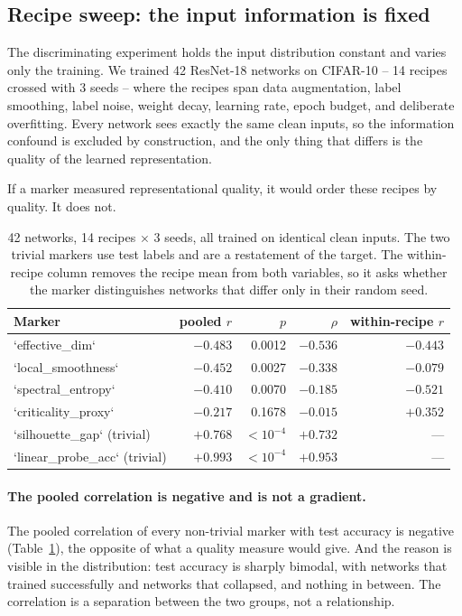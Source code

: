 \documentclass[10pt]{article}
\begin{document}
\subsection{Recipe sweep: the input information is fixed}

The discriminating experiment holds the input distribution constant and varies
only the training. We trained 42 ResNet-18 networks on CIFAR-10 -- 14 recipes
crossed with 3 seeds -- where the recipes span data augmentation, label
smoothing, label noise, weight decay, learning rate, epoch budget, and
deliberate overfitting. Every network sees exactly the same clean inputs, so
the information confound is excluded by construction, and the only thing that
differs is the quality of the learned representation.

If a marker measured representational quality, it would order these recipes by
quality. It does not.

\begin{table}[t]
\centering
\small
\begin{tabular}{@{}lrrrr@{}}
\hline
Marker & pooled $r$ & $p$ & $\rho$ & within-recipe $r$ \\
\hline
`effective\_dim` & $-0.483$ & 0.0012 & $-0.536$ & $-0.443$ \\
`local\_smoothness` & $-0.452$ & 0.0027 & $-0.338$ & $-0.079$ \\
`spectral\_entropy` & $-0.410$ & 0.0070 & $-0.185$ & $-0.521$ \\
`criticality\_proxy` & $-0.217$ & 0.1678 & $-0.015$ & $+0.352$ \\
\hline
`silhouette\_gap` (trivial) & $+0.768$ & $<10^{-4}$ & $+0.732$ & --- \\
`linear\_probe\_acc` (trivial) & $+0.993$ & $<10^{-4}$ & $+0.953$ & --- \\
\hline
\end{tabular}
\caption{42 networks, 14 recipes $\times$ 3 seeds, all trained on identical
clean inputs. The two trivial markers use test labels and are a restatement of
the target. The within-recipe column removes the recipe mean from both
variables, so it asks whether the marker distinguishes networks that differ
only in their random seed.}
\label{tab:recipe}
\end{table}

\paragraph{The pooled correlation is negative and is not a gradient.}
The pooled correlation of every non-trivial marker with test accuracy is
negative (Table~\ref{tab:recipe}), the opposite of what a quality measure
would give. And the reason is visible in the distribution: test accuracy is
sharply bimodal, with networks that trained successfully and networks that
collapsed, and nothing in between. The correlation is a separation between the
two groups, not a relationship.
\end{document}
